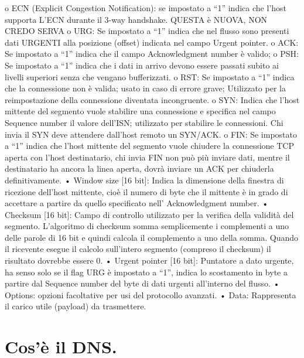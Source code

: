 o	ECN (Explicit Congestion Notification): se impostato a “1” indica che l’host supporta L’ECN durante il 3-way handshake. QUESTA è NUOVA, NON CREDO SERVA
o	URG: Se impostato a “1” indica che nel flusso sono presenti dati URGENTI alla posizione (offset) indicata nel campo Urgent pointer.
o	ACK: Se impostato a “1” indica che il campo Acknowledgment number è valido;
o	PSH: Se impostato a “1” indica che i dati in arrivo devono essere passati subito ai livelli superiori senza che vengano bufferizzati.
o	RST: Se impostato a “1” indica che la connessione non è valida; usato in caso di errore grave; Utilizzato per la reimpostazione della connessione diventata incongruente.
o	SYN: Indica che l’host mittente del segmento vuole stabilire una connessione e specifica nel campo Sequence number il valore dell’ISN; utilizzato per stabilire le connessioni. Chi invia il SYN deve attendere dall’host remoto un SYN/ACK.
o	FIN: Se impostato a “1” indica che l’host mittente del segmento vuole chiudere la connessione TCP aperta con l’host destinatario, chi invia FIN non può più inviare dati, mentre il destinatario ha ancora la linea aperta, dovrà inviare un ACK per chiuderla definitivamente.
•	Window size [16 bit]: Indica la dimensione della finestra di ricezione dell’host mittente, cioè il numero di byte che il mittente è in grado di accettare a partire da quello specificato nell’ Acknowledgment number.
•	Checksum [16 bit]: Campo di controllo utilizzato per la verifica della validità del segmento. L’algoritmo di checksum somma semplicemente i complementi a uno delle parole di 16 bit e quindi calcola il complemento a uno della somma. Quando il ricevente esegue il calcolo sull’intero segmento (compreso il checksum) il risultato dovrebbe essere 0.
•	Urgent pointer [16 bit]: Puntatore a dato urgente, ha senso solo se il flag URG è impostato a “1”, indica lo scostamento in byte a partire dal Sequence number del byte di dati urgenti all’interno del flusso.
•	Options: opzioni facoltative per usi del protocollo avanzati.
•	Data: Rappresenta il carico utile (payload) da trasmettere.
 
\section{Cos’è il DNS.}

